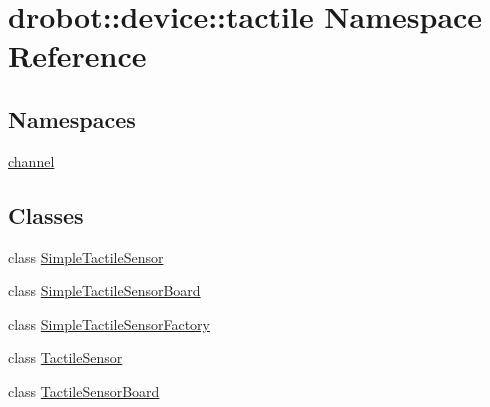 \hypertarget{namespacedrobot_1_1device_1_1tactile}{\section{drobot\-:\-:device\-:\-:tactile Namespace Reference}
\label{namespacedrobot_1_1device_1_1tactile}
}
\subsection*{Namespaces}
\begin{DoxyCompactItemize}
\item 
\hyperlink{namespacedrobot_1_1device_1_1tactile_1_1channel}{channel}
\end{DoxyCompactItemize}
\subsection*{Classes}
\begin{DoxyCompactItemize}
\item 
class \hyperlink{classdrobot_1_1device_1_1tactile_1_1SimpleTactileSensor}{Simple\-Tactile\-Sensor}
\item 
class \hyperlink{classdrobot_1_1device_1_1tactile_1_1SimpleTactileSensorBoard}{Simple\-Tactile\-Sensor\-Board}
\item 
class \hyperlink{classdrobot_1_1device_1_1tactile_1_1SimpleTactileSensorFactory}{Simple\-Tactile\-Sensor\-Factory}
\item 
class \hyperlink{classdrobot_1_1device_1_1tactile_1_1TactileSensor}{Tactile\-Sensor}
\item 
class \hyperlink{classdrobot_1_1device_1_1tactile_1_1TactileSensorBoard}{Tactile\-Sensor\-Board}
\end{DoxyCompactItemize}
